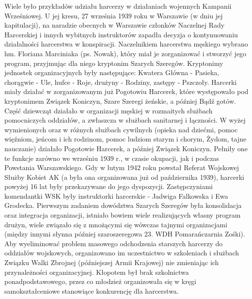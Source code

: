 Wiele było przykładów udziału harcerzy w działaniach wojennych Kampanii Wrześniowej. U jej kresu, 27 września 1939 roku w Warszawie (w dniu jej kapitulacji), na naradzie obecnych w Warszawie członków Naczelnej Rady Harcerskiej i innych wybitnych instruktorów zapadła decyzja o kontynuowaniu działalności harcerstwa w konspiracji. Naczelnikiem harcerstwa męskiego wybrano hm. Floriana Marciniaka (ps. Nowak), który miał je zorganizować i stworzyć jego program, przyjmując dla niego kryptonim Szarych Szeregów. Kryptonimy jednostek organizacyjnych były następujące: Kwatera Główna - Pasieka, chorągwie - Ule, hufce - Roje, drużyny - Rodziny, zastępy - Pszczoły. Harcerki miały działać w zorganizowanym już Pogotowiu Harcerek, które występowało pod kryptonimem Związek Koniczyn, Szare Szeregi żeńskie, a później Bądź gotów. Część dziewcząt działało w organizacji męskiej w rozmaitych służbach pomocniczych oddziałów, a zwłaszcza w służbach sanitarnej i łączności. W wyżej wymienionych oraz w różnych służbach cywilnych (opieka nad dziećmi, pomoc więźniom, jeńcom i ich rodzinom, pomoc ludziom starym i chorym, Żydom, tajne nauczanie) działało Pogotowie Harcerek, a później Związek Koniczyn. Pełniły one te funkcje zarówno we wrześniu 1939 r., w czasie okupacji, jak i podczas Powstania Warszawskiego. Gdy w lutym 1942 roku powstał Referat Wojskowej Służby Kobiet AK (a była ona organizowana już od października 1939), harcerki powyżej 16 lat były przekazywane do jego dyspozycji. Zastępczyniami komendantki WSK były instruktorki harcerskie - Jadwiga Falkowska i Ewa Grodecka. Pierwszym zadaniem dowództwa Szarych Szeregów była konsolidacja oraz integracja organizacji, istniało bowiem wiele realizujących własny program drużyn, wiele związało się z mnożącymi się wówczas tajnymi organizacjami (między innymi słynna później szaroszeregowa 23. WDH Pomarańczarnia Zośki). Aby wyeliminować problem masowego odchodzenia starszych harcerzy do oddziałów wojskowych, organizowano im uczestnictwo w szkoleniach i służbach Związku Walki Zbrojnej (późniejszej Armii Krajowej) nie zmieniając ich przynależności organizacyjnej. Kłopotem był brak szkolnictwa ponadpodstawowego, przez co młodzież organizowała się w kręgi samokształceniowe stanowiące konkurencję dla harcerstwa.


